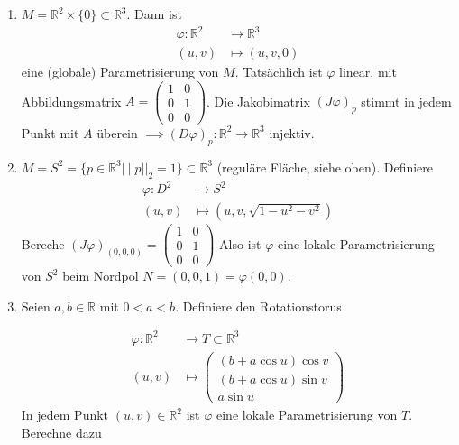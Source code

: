 \documentclass[../main.tex]{subfiles}
\begin{document}
\begin{examples}
\leavevmode
\begin{enumerate}
    \item $M = \mathbb{R}^2 \times \{0\} \subset \mathbb{R}^3$. Dann ist \begin{align*}
        \varphi : \mathbb{R}^2 & \to \mathbb{R}^3 \\
        (u,v) & \mapsto (u,v,0)
    \end{align*}
    eine (globale) Parametrisierung von $M$. Tatsächlich ist $\varphi$ linear, mit Abbildungsmatrix 
    $A =  \left(\begin{smallmatrix} 1 & 0 \\ 0 & 1 \\ 0 & 0
    \end{smallmatrix} \right)$.
    Die Jakobimatrix $(J\varphi )_p$ stimmt in jedem Punkt mit $A$ überein $\implies (D\varphi )_p : \mathbb{R}^2 \to \mathbb{R}^3$ injektiv.
    
    \item
    $M = S^2 = \{ p \in \mathbb{R}^3 \vert \ ||p||_2 = 1 \} \subset \mathbb{R}^3$ (reguläre Fläche, siehe oben).
    Definiere \begin{align*}
        \varphi \colon D^2 & \to S^2 \\
        (u,v) &\mapsto (u,v, \sqrt{1-u^2-v^2})
    \end{align*}
    Bereche $(J \varphi)_{(0,0,0)} = \left(\begin{smallmatrix} 1 & 0 \\ 0 & 1 \\ 0 & 0
    \end{smallmatrix} \right)$ Also ist $\varphi$ eine lokale Parametrisierung von $S^2$ beim Nordpol $N=(0,0,1)=\varphi(0,0)$.
    
    
    \item
    Seien $a,b \in \mathbb{R} $ mit $0 < a < b$. Definiere den Rotationstorus \\
    \begin{minipage}[b]{30em}
        
        \begin{align*}
        \varphi \colon \mathbb{R}^2 & \to T \subset \mathbb{R}^3 \\
        (u,v) & \mapsto \begin{pmatrix}(b+a \cos u)\cos v
        \\(b+a \cos u)\sin v
        \\ a \sin u\end{pmatrix}
    \end{align*}
    In jedem Punkt $(u,v) \in \mathbb{R}^2$ ist $\varphi$ eine lokale Parametrisierung von $T$. Berechne dazu
    \end{minipage}
    \begin{minipage}[b]{10em}
    \end{minipage}
    

\end{enumerate}
\end{examples}
\end{document}

